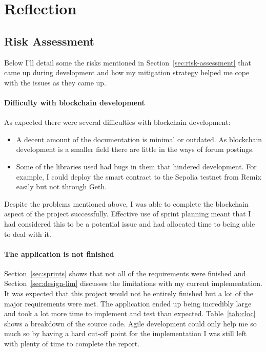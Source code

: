 \section{Reflection}

\subsection{Risk Assessment}

Below I'll detail some the risks mentioned in Section~\ref{sec:risk-assessment} that came up during development and how my mitigation strategy helped me cope with the issues as they came up.

\paragraph*{Difficulty with blockchain development}
As expected there were several difficulties with blockchain development:

\begin{itemize}
  \item A decent amount of the documentation is minimal or outdated. As blockchain development is a smaller field there are little in the ways of forum postings.
  \item Some of the libraries used had bugs in them that hindered development. For example, I could deploy the smart contract to the Sepolia testnet from Remix easily but not through Geth. 
\end{itemize}

\vspace{2mm}\noindent
Despite the problems mentioned above, I was able to complete the blockchain aspect of the project successfully. Effective use of sprint planning meant that I had considered this to be a potential issue and had allocated time to being able to deal with it.

\paragraph*{The application is not finished}
Section~\ref{sec:sprints} shows that not all of the requirements were finished and Section~\ref{sec:design-lim} discusses the limitations with my current implementation. It was expected that this project would not be entirely finished but a lot of the major requirements were met.
\x
The application ended up being incredibly large and took a lot more time to implement and test than expected. Table~\ref{tab:cloc} shows a breakdown of the source code. Agile development could only help me so much so by having a hard cut-off point for the implementation I was still left with plenty of time to complete the report.

